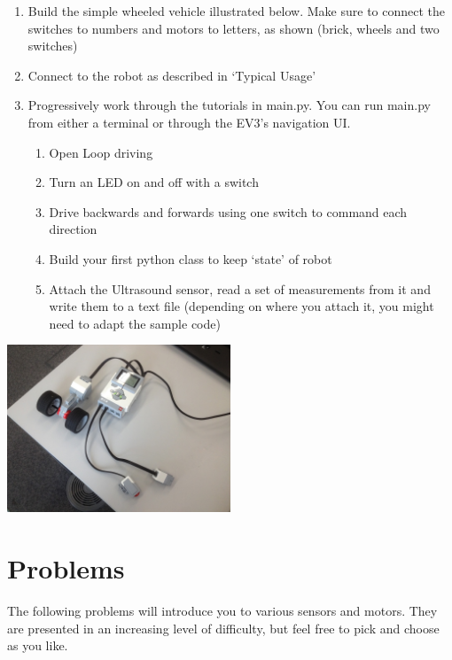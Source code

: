 \documentclass{article}
\begin{document}
  \begin{enumerate}
    \item Build the simple wheeled vehicle illustrated below. Make sure to connect the switches to 
        numbers and motors to letters, as shown (brick, wheels and two switches)
    \item Connect to the robot as described in ‘Typical Usage’ 
    \item Progressively work through the tutorials in main.py. You can run main.py from either a 
        terminal or through the EV3’s navigation UI. 
        \begin{enumerate}
            \item Open Loop driving 
            \item Turn an LED on and off with a switch 
            \item Drive backwards and forwards using one switch to command each direction 
            \item Build your first python class to keep ‘state’ of robot  
            \item Attach the Ultrasound sensor, read a set of measurements from it and 
                write them to a text file (depending on where you attach it, you might need to
                adapt the sample code)
        \end{enumerate}
  \end{enumerate}

  \begin{center}
    \includegraphics[width=0.5\textwidth]{basic_robot}
  \end{center}


  \section{Problems}

  The following problems will introduce you to various sensors and motors. They are 
  presented in an increasing level of difficulty, but feel free to pick and choose as
  you like.
\end{document}
